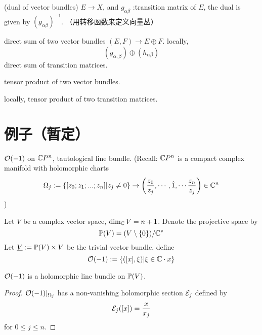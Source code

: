 \begin{definition}(dual of vector bundles)
$E\to X$, and $g_{\alpha\beta}$ :transition matrix of $E$,
the dual is given by
$(g_{\alpha\beta})^{-1}$.
（用转移函数来定义向量丛）
\end{definition}

\begin{definition}
direct sum of two vector bundles $(E,F)\to E\oplus F$.
locally,
$$(g_{\alpha,\beta})\oplus(h_{\alpha\beta})$$
direct sum of transition matrices.
\end{definition}

\begin{definition}
tensor product of two vector bundles.

locally, tensor product of two transition matrices.
\end{definition}
\section{例子（暂定）}

\begin{example}
$\mathcal{O}(-1)$ on $\mathbb{C} P^n$, tautological line bundle.
(Recall: $\mathbb{C} P^n$ is a compact complex manifold with holomorphic charts
$$\Omega_j:=\{[z_0;z_1;...;z_n]|z_j\neq 0\}\to
\left(
\frac{z_0}{z_j},\cdots,\hat{1},\cdots
\frac{z_n}{z_j}
\right)\in\mathbb{C}^n$$
)
\end{example}

Let $V$ be a complex vector space, $\dim_{\mathbb{C}} V=n+1$.
Denote the projective space by
$$\mathbb{P}(V)=(V\setminus\{0\})/\mathbb{C}^*$$
Let $\underline{V}:=\mathbb{P}(V)\times V$ be the trivial vector bundle,
define
$$\mathcal{O}(-1):=\{([x],\xi)|\xi\in\mathbb{C}\cdot x\}$$

\begin{prop}
$\mathcal{O}(-1)$ is a holomorphic line bundle on $\mathbb{P}(V)$.
\end{prop}
\begin{proof}
$\mathcal{O}(-1)|_{\Omega_j}$ has a non-vanishing holomorphic section $\mathcal{E}_j$ defined by
$$\mathcal{E}_j([x])=\frac{x}{x_j}$$
for $0\leq j\leq n$.
\end{proof}
